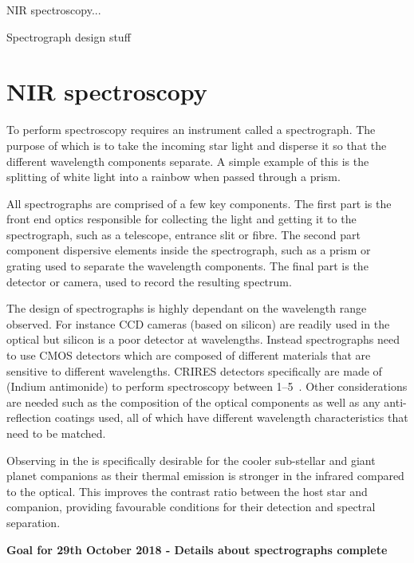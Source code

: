 
NIR spectroscopy...

Spectrograph design stuff


\section{NIR spectroscopy}
To perform spectroscopy requires an instrument called a spectrograph. The purpose of which is to take the incoming star light and disperse it so that the different wavelength components separate. A simple example of this is the splitting of white light into a rainbow when passed through a prism.

All spectrographs are comprised of a few key components.
The first part is the front end optics responsible for collecting the light and getting it to the spectrograph, such as a telescope, entrance slit or fibre.
The second part component dispersive elements inside the spectrograph, such as a prism or grating used to separate the wavelength components.
The final part is the detector or camera, used to record the resulting spectrum.

The design of spectrographs is highly dependant on the wavelength range observed. For instance {CCD} cameras (based on silicon) are readily used in the optical but silicon is a poor detector at \nir{} wavelengths.
Instead \nir{} spectrographs need to use CMOS detectors which are composed of different materials that are sensitive to different wavelengths.
{CRIRES} detectors specifically are made of  (Indium antimonide) to perform spectroscopy between 1--5\um{}~\cite{dorn_crires_2004}.
Other considerations are needed such as the composition of the optical components as well as any anti-reflection coatings used, all of which have different wavelength characteristics that need to be matched.





Observing in the \nir{} is specifically desirable for the cooler sub-stellar and giant planet companions as their thermal emission is stronger in the infrared compared to the optical.
This improves the contrast ratio between the host star and companion, providing favourable conditions for their detection and spectral separation.


\textbf{Goal for 29th October 2018 - Details about spectrographs complete }

